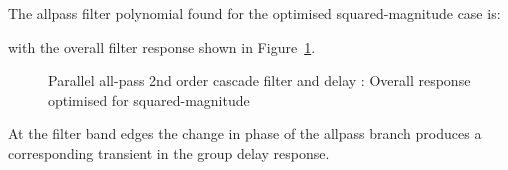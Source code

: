 \documentclass[a4paper,twoside,10pt,english]{report}
\begin{document}
The allpass filter polynomial found for the optimised squared-magnitude case is:
\begin{small}

\end{small}
with the overall filter response shown in 
Figure~\ref{fig:Allpass-2nd-order-cascade-delay-squared-magnitude-response}.
\begin{figure}[!htbp]
\begin{center}
\scalebox{0.7}{}
\caption{Parallel all-pass 2nd order cascade filter and delay : Overall response optimised for squared-magnitude}
\label{fig:Allpass-2nd-order-cascade-delay-squared-magnitude-response}
\end{center}
\end{figure}
At the filter band edges the change in phase of the allpass branch produces a 
corresponding transient in the group delay response.
\end{document}
